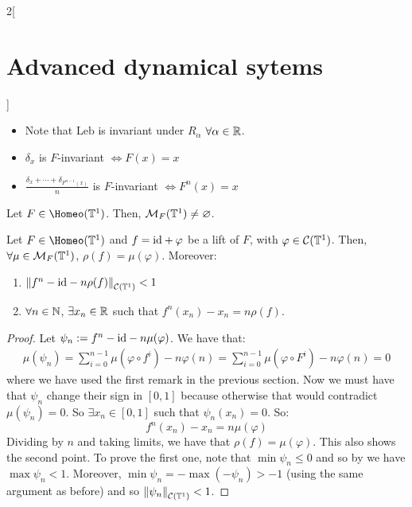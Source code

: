 \documentclass[../../../main_math.tex]{subfiles}
\begin{document}
\begin{multicols}{2}[\section{Advanced dynamical sytems}]
\begin{proposition}
\begin{itemize}
      \item Note that $\text{Leb}$ is invariant under $R_\alpha$ $\forall \alpha\in\mathbb{R}$.
      \item $\delta_x$ is $F$-invariant $\iff F(x)=x$
      \item $\displaystyle\frac{\delta_x+\cdots+\delta_{F^{n-1}(x)}}{n}$ is $F$-invariant $\iff F^n(x)=x$
    \end{itemize}
  \end{proposition}
  \begin{theorem}
    Let $F\in\Homeo(\TT^1)$. Then, $\mathcal{M}_F(\mathbb{T}^1)\ne\varnothing$.
  \end{theorem}
  \begin{proposition}
    Let $F\in\Homeo(\TT^1)$ and $f=\mathrm{id}+\varphi$ be a lift of $F$, with $\varphi\in\mathcal{C}(\mathbb{T}^1)$. Then, $\forall\mu\in\mathcal{M}_F(\mathbb{T}^1)$, $\rho(f)=\mu(\varphi)$. Moreover:
    \begin{enumerate}
      \item $\left\|f^n-\mathrm{id} -n\rho(f)\right\|_{\mathcal{C}(\mathbb{T}^1)}<1$
      \item $\forall n\in\mathbb{N}$, $\exists x_n\in\mathbb{R}$ such that $f^n(x_n)-x_n=n\rho(f)$.
    \end{enumerate}
  \end{proposition}
  \begin{proof}
    Let $\psi_n:= f^n-\mathrm{id} -n\mu(\varphi)$. We have that:
    \begin{multline*}
      \mu(\psi_n)=\sum_{i=0}^{n-1}\mu(\varphi\circ f^i)-n\varphi(n)=\sum_{i=0}^{n-1}\mu(\varphi\circ F^i)-n\varphi(n)=0
    \end{multline*}
    where we have used the first remark in the previous section. Now we must have that $\psi_n$ change their sign in $[0,1]$ because otherwise that would contradict $\mu(\psi_n)=0$. So $\exists x_n\in[0,1]$ such that $\psi_n(x_n)=0$. So:
    $$
      f^n(x_n)-x_n=n\mu(\varphi)
    $$
    Dividing by $n$ and taking limits, we have that $\rho(f)=\mu(\varphi)$. This also shows the second point. To prove the first one, note that $\min\psi_n\leq 0$ and so by  we have $\max\psi_n <1$. Moreover, $\min\psi_n =-\max(-\psi_n) >-1$ (using the same argument as before) and so $\left\|\psi_n\right\|_{\mathcal{C}(\mathbb{T}^1)}<1$.
  \end{proof}

\end{multicols}
\end{document}
